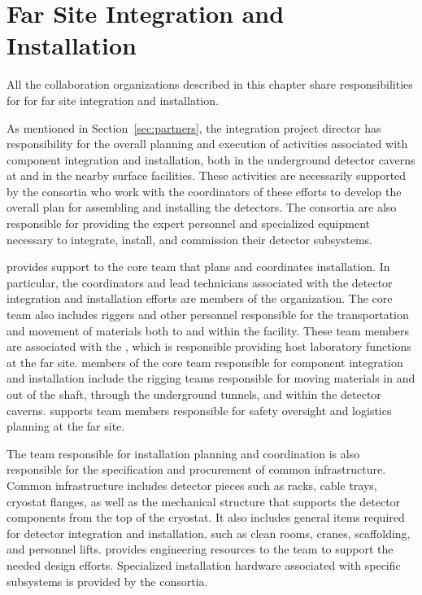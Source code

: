 \section{Far Site Integration and Installation}
\label{sec:far_site}

All the collaboration organizations described in this chapter share responsibilities for for far site integration and installation. 
 
As mentioned in Section~\ref{sec:partners}, the integration project director has
responsibility for the overall planning and execution of activities
associated with component integration and installation, both in the
 underground detector caverns at  and in the nearby surface facilities. 
These activities are necessarily supported by the  consortia who
work with the coordinators of these efforts to develop the overall
plan for assembling and installing the detectors.  The consortia are
also responsible for providing the expert personnel and specialized
equipment necessary to integrate, install, and commission their
detector subsystems.

  provides support to the core  team that plans and coordinates installation. 
In particular, the coordinators and lead technicians associated with the
detector integration and installation efforts are members of the
 organization.  The core team also includes
riggers and other personnel responsible for the transportation and
movement of materials both to and within the  facility.  These
team members are associated with the  , which is responsible providing host laboratory functions at
the far site.   members of the  core team responsible for
component integration and installation include the rigging teams
responsible for moving materials in and out of the shaft, through the
underground tunnels, and within the detector caverns.   
supports team members responsible for safety oversight and logistics
planning at the far site.


The  team responsible for installation planning and coordination is
also responsible for the specification and procurement of
common infrastructure.  Common infrastructure includes detector pieces
such as racks, cable trays, cryostat flanges, as well as the
mechanical structure that supports the detector components from the
top of the cryostat.  It also includes general items required for
detector integration and installation, such as clean rooms, cranes,
scaffolding, and personnel lifts.  
provides engineering resources to the  team to support the needed
design efforts. Specialized installation hardware associated with
specific subsystems is provided by the consortia.

